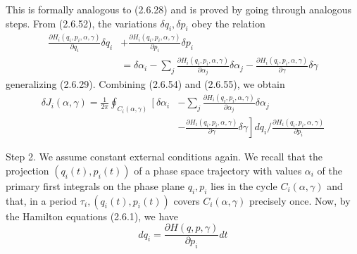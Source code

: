 \documentclass{article}
\begin{document}
This is formally analogous to (2.6.28) and is proved by going through analogous steps. From (2.6.52), the variations $\delta q_{i}, \delta p_{i}$ obey the relation
$$
\begin{align*}
\frac{\partial H_{i}\left(q_{i}, p_{i}, \alpha, \gamma\right)}{\partial q_{i}} \delta q_{i} & +\frac{\partial H_{i}\left(q_{i}, p_{i}, \alpha, \gamma\right)}{\partial p_{i}} \delta p_{i}  \tag{2.6.55}\\
& =\delta \alpha_{i}-\sum_{j} \frac{\partial H_{i}\left(q_{i}, p_{i}, \alpha, \gamma\right)}{\partial \alpha_{j}} \delta \alpha_{j}-\frac{\partial H_{i}\left(q_{i}, p_{i}, \alpha, \gamma\right)}{\partial \gamma} \delta \gamma
\end{align*}
$$
generalizing (2.6.29). Combining (2.6.54) and (2.6.55), we obtain
$$
\begin{align*}
\delta J_{i}(\alpha, \gamma)=\frac{1}{2 \pi} \oint_{C_{i}(\alpha, \gamma)}\left[\delta \alpha_{i}\right. & -\sum_{j} \frac{\partial H_{i}\left(q_{i}, p_{i}, \alpha, \gamma\right)}{\partial \alpha_{j}} \delta \alpha_{j}  \tag{2.6.56}\\
& \left.-\frac{\partial H_{i}\left(q_{i}, p_{i}, \alpha, \gamma\right)}{\partial \gamma} \delta \gamma\right] d q_{i} / \frac{\partial H_{i}\left(q_{i}, p_{i}, \alpha, \gamma\right)}{\partial p_{i}}
\end{align*}
$$

Step 2. We assume constant external conditions again. We recall that the projection $\left(q_{i}(t), p_{i}(t)\right)$ of a phase space trajectory with values $\alpha_{i}$ of the primary first integrals on the phase plane $q_{i}, p_{i}$ lies in the cycle $C_{i}(\alpha, \gamma)$ and that, in a period $\tau_{i},\left(q_{i}(t), p_{i}(t)\right)$ covers $C_{i}(\alpha, \gamma)$ precisely once. Now, by the Hamilton equations (2.6.1), we have
$$
\begin{equation*}
d q_{i}=\frac{\partial H(q, p, \gamma)}{\partial p_{i}} d t \tag{2.6.57}
\end{equation*}
$$
\end{document}
